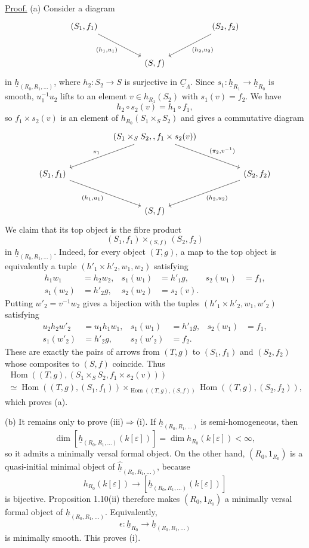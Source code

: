 \underline{Proof.} (a) Consider a diagram
\[
\begin{tikzcd}[column sep=huge,row sep=large]
 (S_1,f_1) \arrow[dr,"{(h_1,u_1)}"']
 && (S_2,f_2) \arrow[dl,"{(h_2,u_2)}"]\\
 & (S,f) &
\end{tikzcd}
\]
in $\underline h_{(R_0,R_1,\ldots)}$, where
$h_2:S_2\longrightarrow S$ is surjective in
$\underline C_\Lambda$. Since
$s_1:\underline h_{R_1}\longrightarrow\underline h_{R_0}$ is
smooth, $u_1^{-1}u_2$ lifts to an element $v\in h_{R_1}(S_2)$ with
$s_1(v)=f_2$. We have
\[
 h_2\circ s_2(v)=h_1\circ f_1,
\]
so $f_1\times s_2(v)$ is an element of
$h_{R_0}(S_1\times_SS_2)$ and gives a commutative diagram
\[
\begin{tikzcd}[column sep=huge,row sep=large]
 & (S_1\times_SS_2,,f_1\times s_2(v))
   \arrow[dl,"{\pi_1}"']
   \arrow[dr,"{(\pi_2,v^{-1})}"] &\\
 (S_1,f_1) \arrow[dr,"{(h_1,u_1)}"']
 && (S_2,f_2) \arrow[dl,"{(h_2,u_2)}"]\\
 & (S,f) &
\end{tikzcd}
\]
We claim that its top object is the fibre product
\[
 (S_1,f_1)\times_{(S,f)}(S_2,f_2)
\]
in $\underline h_{(R_0,R_1,\ldots)}$. Indeed, for every object
$(T,g)$, a map to the top object is equivalently a tuple
$(h'_1\times h'_2,w_1,w_2)$ satisfying
\begin{align*}
 h_1w_1&=h_2w_2,&
 s_1(w_1)&=h'_1g,&s_2(w_1)&=f_1,\\
 s_1(w_2)&=h'_2g,&
 s_2(w_2)&=s_2(v).
\end{align*}
Putting $w'_2=v^{-1}w_2$ gives a bijection with the tuples
$(h'_1\times h'_2,w_1,w'_2)$ satisfying
\begin{align*}
 u_2h_2w'_2&=u_1h_1w_1,&
 s_1(w_1)&=h'_1g,&s_2(w_1)&=f_1,\\
 s_1(w'_2)&=h'_2g,&
 s_2(w'_2)&=f_2.
\end{align*}
These are exactly the pairs of arrows from $(T,g)$ to $(S_1,f_1)$
and $(S_2,f_2)$ whose composites to $(S,f)$ coincide. Thus
\begin{multline*}
 \operatorname{Hom}((T,g),(S_1\times_SS_2,
                 f_1\times s_2(v)))\\
 \simeq
 \operatorname{Hom}((T,g),(S_1,f_1))
 \times_{\operatorname{Hom}((T,g),(S,f))}
 \operatorname{Hom}((T,g),(S_2,f_2)),
\end{multline*}
which proves (a).


(b) It remains only to prove (iii)$\Rightarrow$(i). If
$\underline h_{(R_0,R_1,\ldots)}$ is semi-homogeneous, then
\[
 \dim[\underline h_{(R_0,R_1,\ldots)}(k[\varepsilon])]
 =\dim h_{R_0}(k[\varepsilon])<\infty,
\]
so it admits a minimally versal formal object. On the other hand,
$(R_0,1_{R_0})$ is a quasi-initial minimal object of
$\widehat{\underline h}_{(R_0,R_1,\ldots)}$, because
\[
 h_{R_0}(k[\varepsilon])
 \longrightarrow
 [\underline h_{(R_0,R_1,\ldots)}(k[\varepsilon])]
\]
is bijective. Proposition 1.10(ii) therefore makes
$(R_0,1_{R_0})$ a minimally versal formal object of
$\underline h_{(R_0,R_1,\ldots)}$. Equivalently,
\[
 \epsilon:\underline h_{R_0}
 \longrightarrow\underline h_{(R_0,R_1,\ldots)}
\]
is minimally smooth. This proves (i).
